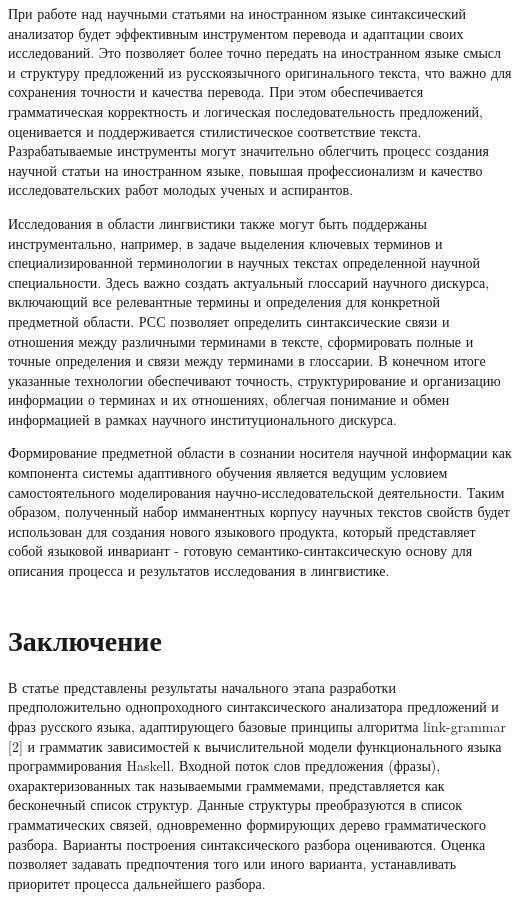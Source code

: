 \documentclass[
]{ceurart}
\begin{document}
При работе над научными статьями на иностранном языке синтаксический
анализатор будет эффективным инструментом перевода и адаптации своих
исследований. Это позволяет более точно передать на иностранном языке
смысл и структуру предложений из русскоязычного оригинального текста,
что важно для сохранения точности и качества перевода. При этом
обеспечивается грамматическая корректность и логическая
последовательность предложений, оценивается и поддерживается
стилистическое соответствие текста. Разрабатываемые инструменты могут
значительно облегчить процесс создания научной статьи на иностранном
языке, повышая профессионализм и качество исследовательских работ
молодых ученых и аспирантов.

Исследования в области лингвистики также могут быть поддержаны
инструментально, например, в задаче выделения ключевых терминов и
специализированной терминологии в научных текстах определенной научной
специальности. Здесь важно создать актуальный глоссарий научного
дискурса, включающий все релевантные термины и определения для
конкретной предметной области. РСС позволяет определить синтаксические
связи и отношения между различными терминами в тексте, сформировать
полные и точные определения и связи между терминами в глоссарии. В
конечном итоге указанные технологии обеспечивают точность,
структурирование и организацию информации о терминах и их отношениях,
облегчая понимание и обмен информацией в рамках научного
институционального дискурса.

Формирование предметной области в сознании носителя научной информации
как компонента системы адаптивного обучения является ведущим условием
самостоятельного моделирования научно-исследовательской деятельности.
Таким образом, полученный набор имманентных корпусу научных текстов
свойств будет использован для создания нового языкового продукта,
который представляет собой языковой инвариант - готовую
семантико-синтаксическую основу для описания процесса и результатов
исследования в лингвистике.

\section{Заключение}

В статье представлены результаты начального этапа разработки
предположительно однопроходного синтаксического анализатора предложений
и фраз русского языка, адаптирующего базовые принципы алгоритма
link-grammar {[}2{]} и грамматик зависимостей к вычислительной модели
функционального языка программирования Haskell. Входной поток слов
предложения (фразы), охарактеризованных так называемыми граммемами,
представляется как бесконечный список структур. Данные структуры
преобразуются в список грамматических связей, одновременно формирующих
дерево грамматического разбора. Варианты построения синтаксического
разбора оцениваются. Оценка позволяет задавать предпочтения того или
иного варианта, устанавливать приоритет процесса дальнейшего разбора.
\end{document}
